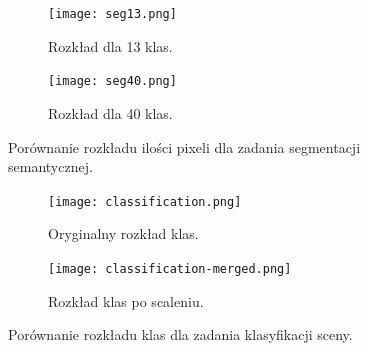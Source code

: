 \begin{figure}[ht!]
    \centering
    \begin{subfigure}[b]{0.49\textwidth}
        \centering
        \texttt{[image: seg13.png]}
        \caption{Rozkład dla 13 klas.}
        \label{fig:rozklad-13klas-seg}
    \end{subfigure}
    \hfill
    \begin{subfigure}[b]{0.49\textwidth}
        \centering
        \texttt{[image: seg40.png]}
        \caption{Rozkład dla 40 klas.}
        \label{fig:rozklad-40klas-seg}
    \end{subfigure}
    \caption[]{Porównanie rozkładu ilości pixeli dla zadania segmentacji semantycznej.}
    \label{fig:rozklad-segm}
\end{figure}
\begin{figure}
    \centering
    \begin{subfigure}[b]{0.49\textwidth}
        \centering
        \texttt{[image: classification.png]}
        \caption{Oryginalny rozkład klas.}
        \label{fig:27 klas dystrybucja}
    \end{subfigure}
    \hfill
    \begin{subfigure}[b]{0.49\textwidth}
        \centering
        \texttt{[image: classification-merged.png]}
        \caption{Rozkład klas po scaleniu.}
        \label{fig:7 klas dystrybucja}
    \end{subfigure}
    \caption[]{Porównanie rozkładu klas dla zadania klasyfikacji sceny.}
\end{figure}



































